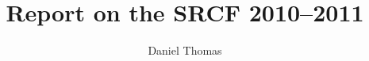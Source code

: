 \documentclass[12pt,a4paper,twoside]{article}
\begin{document}
\title{Report on the SRCF 2010--2011}
\author{Daniel Thomas}
\maketitle



\end{document}
